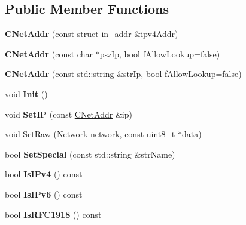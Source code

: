\subsection*{Public Member Functions}
\begin{DoxyCompactItemize}
\item 
\mbox{\label{class_c_net_addr_a0af492cd8aca9bbaa3392cdbfbb55681}} 
{\bfseries C\+Net\+Addr} (const struct in\+\_\+addr \&ipv4\+Addr)
\item 
\mbox{\label{class_c_net_addr_a3549332f92d95ccadf262bdce9f4eacf}} 
{\bfseries C\+Net\+Addr} (const char $\ast$psz\+Ip, bool f\+Allow\+Lookup=false)
\item 
\mbox{\label{class_c_net_addr_ae237602be0e4bce6ff31061270371144}} 
{\bfseries C\+Net\+Addr} (const std\+::string \&str\+Ip, bool f\+Allow\+Lookup=false)
\item 
\mbox{\label{class_c_net_addr_adab412fbc5a9203bea90ae173996ab10}} 
void {\bfseries Init} ()
\item 
\mbox{\label{class_c_net_addr_a1c6087345e5ca07a151451cd6deb974f}} 
void {\bfseries Set\+IP} (const \mbox{\hyperlink{class_c_net_addr}{C\+Net\+Addr}} \&ip)
\item 
void \mbox{\hyperlink{class_c_net_addr_a1f0b23aca4ca78c11735d13f3583b7ad}{Set\+Raw}} (Network network, const uint8\+\_\+t $\ast$data)
\item 
\mbox{\label{class_c_net_addr_aa3e44dfd064d9d8da1cb48cdcb7dd231}} 
bool {\bfseries Set\+Special} (const std\+::string \&str\+Name)
\item 
\mbox{\label{class_c_net_addr_a7021b79e9a33c342b68db09dbb6c2293}} 
bool {\bfseries Is\+I\+Pv4} () const
\item 
\mbox{\label{class_c_net_addr_aad5f7a372c56ccf4d773f728b6b46e18}} 
bool {\bfseries Is\+I\+Pv6} () const
\item 
\mbox{\label{class_c_net_addr_a6c6d7376d8d0ae4c7cb0893add58069f}} 
bool {\bfseries Is\+R\+F\+C1918} () const
\item 

\end{DoxyCompactItemize}
